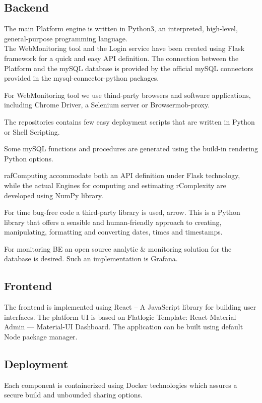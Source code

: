 \subsection{Backend}
The main Platform engine is written in Python3, an interpreted, high-level, general-purpose programming language. \\

The WebMonitoring tool and the Login service have been created using Flask framework for a quick and easy API definition. The connection between the Platform and the mySQL database is provided by the official mySQL connectors provided in the mysql-connector-python packages.

For WebMonitoring tool we use thind-party browsers and software applications, including Chrome Driver, a Selenium server or Browsermob-proxy.

The repositories contains few easy deployment scripts that are written in Python or Shell Scripting.

Some mySQL functions and procedures are generated using the build-in rendering Python options.

rafComputing accommodate both an API definition under Flask technology, while the actual Engines for computing and estimating rComplexity are developed using NumPy library.

For time bug-free code a third-party library is used, arrow. This is a Python library that offers a sensible and human-friendly approach to creating, manipulating, formatting and converting dates, times and timestamps.

For monitoring BE an open source analytic \& monitoring solution for the database is desired. Such an implementation is Grafana.



\subsection{Frontend}
The frontend is implemented using React – A JavaScript library for building user interfaces. The platform UI is based on Flatlogic Template: React Material Admin — Material-UI Dashboard. The application can be built using default Node package manager.

\subsection{Deployment}

Each component is containerized using Docker technologies which assures a secure build and unbounded sharing options.

